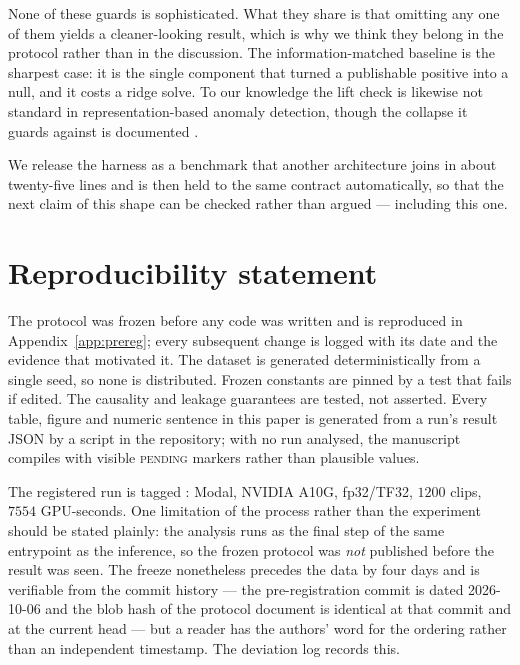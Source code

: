 None of these guards is sophisticated. What they share is that omitting any one
of them yields a cleaner-looking result, which is why we think they belong in
the protocol rather than in the discussion. The information-matched baseline is
the sharpest case: it is the single component that turned a publishable
positive into a null, and it costs a ridge solve. To our knowledge the lift
check is likewise not standard in representation-based anomaly detection,
though the collapse it guards against is documented
\citep{pavuluri2026asleep}.

We release the harness as a benchmark that another architecture joins in about
twenty-five lines and is then held to the same contract automatically, so that
the next claim of this shape can be checked rather than argued --- including
this one.

\section*{Reproducibility statement}

The protocol was frozen before any code was written and is reproduced in
Appendix~\ref{app:prereg}; every subsequent change is logged with its date and
the evidence that motivated it. The dataset is generated deterministically from
a single seed, so none is distributed. Frozen constants are pinned by a test
that fails if edited. The causality and leakage guarantees are tested, not
asserted. Every table, figure and numeric sentence in this paper is generated
from a run's result JSON by a script in the repository; with no run analysed,
the manuscript compiles with visible \textsc{pending} markers rather than
plausible values.

The registered run is tagged : Modal, NVIDIA
A10G, fp32/TF32, $1200$ clips, $7554$ GPU-seconds. One limitation of the
process rather than the experiment should be stated plainly: the analysis runs
as the final step of the same entrypoint as the inference, so the frozen
protocol was \emph{not} published before the result was seen. The freeze
nonetheless precedes the data by four days and is verifiable from the commit
history --- the pre-registration commit is dated 2026-10-06 and the blob hash
of the protocol document is identical at that commit and at the current head
--- but a reader has the authors' word for the ordering rather than an
independent timestamp. The deviation log records this.
